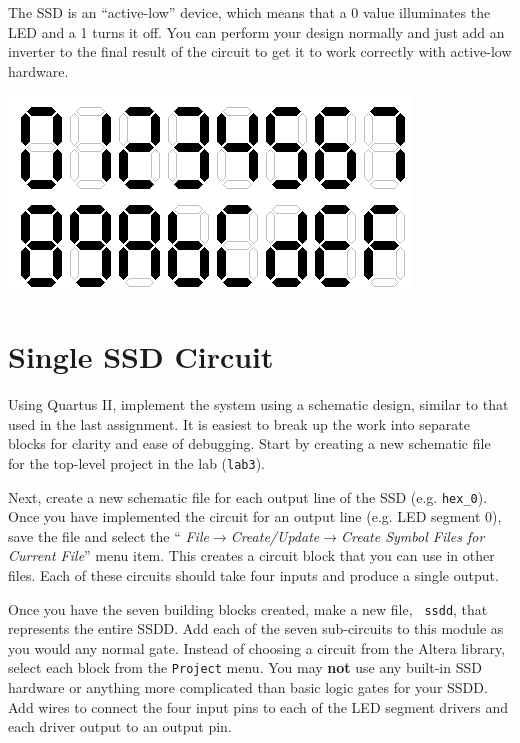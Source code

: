 \documentclass[10pt]{article}
\begin{document}
The SSD is an ``active-low'' device, which means that a 0 value
illuminates the LED and a 1 turns it off. You can perform your design
normally and just add an inverter to the final result of the circuit
to get it to work correctly with active-low hardware.

\begin{center}
\includegraphics[scale=1.0]{hex7seg.png}
\end{center}

\section{Single SSD Circuit}

Using Quartus II, implement the system using a schematic design,
similar to that used in the last assignment. It is easiest to break
up the work into separate blocks for clarity and ease of
debugging. Start by creating a new schematic file for the top-level
project in the lab ({\tt lab3}).

Next, create a new schematic file for each output line of the
SSD (e.g. {\tt hex\_0}). Once you have implemented the circuit for an output line
(e.g. LED segment 0), save the file and select the ``{\it
  File$\rightarrow$Create/Update$\rightarrow$Create Symbol Files for
  Current File}'' menu item. This creates a circuit block that you can
use in other files. Each of these circuits should take four inputs and
produce a single output.

Once you have the seven building blocks created, make a new file, {\tt
  ssdd}, that represents the entire SSDD. Add each of the seven
sub-circuits to this module as you would any normal gate. Instead of
choosing a circuit from the Altera library, select each block from the
{\tt Project} menu. You may {\bf not} use any built-in SSD hardware or
anything more complicated than basic logic gates for your SSDD. Add
wires to connect the four input pins to each of the LED segment
drivers and each driver output to an output pin.
\end{document}
